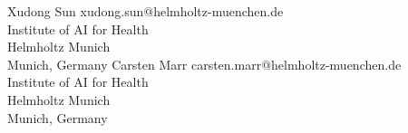 \name Xudong Sun \email xudong.sun@helmholtz-muenchen.de \\
\addr Institute of AI for Health\\
Helmholtz Munich\\
Munich, Germany
\AND
\name Carsten Marr \email carsten.marr@helmholtz-muenchen.de \\
\addr Institute of AI for Health\\
Helmholtz Munich\\
Munich, Germany
